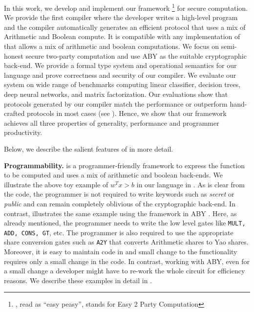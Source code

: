 In this work, we develop and implement our framework \tool\footnote{\tool, read as ``easy peasy'', stands for Easy 2 Party Computation} for secure
computation. We provide the first compiler where the developer writes a high-level program and the compiler automatically generates an efficient \mpc protocol that uses a
mix of Arithmetic and Boolean compute. 
It is compatible with any implementation of \mpc that allows a mix of arithmetic and boolean computations. 
We focus on semi-honest secure two-party computation and use ABY \cite{aby} as the suitable cryptographic back-end.
We provide a formal type system and operational semantics for our language and prove correctness and security of our compiler.
We evaluate our system on wide range of benchmarks \cite{shafindss,wu,minionn,valeriaMatrix} computing linear classifier, decision trees, deep neural networks, and matrix factorization. Our evaluations show that protocols generated by our compiler match
the performance or outperform hand-crafted protocols in most cases (see
). 
Hence, we show that our framework achieves all three properties of generality, performance and programmer productivity. 


Below, we describe the salient features of \tool in more detail.


\textbf{Programmability.} \tool is a programmer-friendly framework to
express the function to be computed and uses a mix of arithmetic and
boolean \mpc back-ends. We illustrate the above toy example of $w^Tx
>b$ in our language in . As is clear from the code,
the programmer is not required to write keywords such as {\em secret}
or {\em public} and can remain completely oblivious of the
cryptographic back-end. In contrast,  illustrates
the same example using the framework in ABY \cite{aby}. Here, as
already mentioned, the programmer needs to write the low level gates
like {\tt MULT, ADD, CONS, GT}, etc. The programmer is also required
to use the appropriate share conversion gates such as {\tt A2Y} that
converts Arithmetic shares to Yao shares. Moreover, it is easy to
maintain code in \tool and small change to the functionality requires
only a small change in the code. In contrast, working with ABY, even
for a small change a developer might have to re-work the whole circuit
for efficiency reasons. We describe these examples in detail in
.

